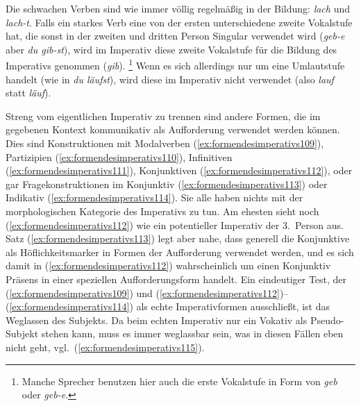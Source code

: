 Die schwachen Verben sind wie immer völlig regelmäßig in der Bildung: \textit{lach} und \textit{lach-t}.
Falls ein starkes Verb eine von der ersten unterschiedene zweite Vokalstufe hat, die sonst in der zweiten und dritten Person Singular verwendet wird (\textit{geb-e} aber \textit{du gib-st}), wird im Imperativ diese zweite Vokalstufe für die Bildung des Imperativs genommen (\textit{gib}).%
\footnote{Manche Sprecher benutzen hier auch die erste Vokalstufe in Form von \textit{geb} oder \textit{geb-e}.}
Wenn es sich allerdings nur um eine Umlautstufe handelt (wie in \textit{du läufst}), wird diese im Imperativ nicht verwendet (also \textit{lauf} statt \textit{\Ast läuf}).

Streng vom eigentlichen Imperativ zu trennen sind andere Formen, die im gegebenen Kontext kommunikativ als Aufforderung verwendet werden können.
Dies sind \zB Konstruktionen mit Modalverben (\ref{ex:formendesimperativs109}), Partizipien (\ref{ex:formendesimperativs110}), Infinitiven (\ref{ex:formendesimperativs111}), Konjunktiven (\ref{ex:formendesimperativs112}), oder gar Fragekonstruktionen im Konjunktiv (\ref{ex:formendesimperativs113}) oder Indikativ (\ref{ex:formendesimperativs114}).
Sie alle haben nichts mit der morphologischen Kategorie des Imperativs zu tun.
Am ehesten sieht noch (\ref{ex:formendesimperativs112}) wie ein potentieller Imperativ der 3.~Person aus.
Satz (\ref{ex:formendesimperativs113}) legt aber nahe, dass generell die Konjunktive als Höflichkeitsmarker in Formen der Aufforderung verwendet werden, und es sich damit in (\ref{ex:formendesimperativs112}) wahrscheinlich um einen Konjunktiv Präsens in einer speziellen Aufforderungsform handelt.
Ein eindeutiger Test, der (\ref{ex:formendesimperativs109}) und (\ref{ex:formendesimperativs112})--(\ref{ex:formendesimperativs114}) als echte Imperativformen ausschließt, ist das Weglassen des Subjekts.
Da beim echten Imperativ nur ein Vokativ als Pseudo-Subjekt stehen kann, muss es immer weglassbar sein, was in diesen Fällen eben nicht geht, vgl.\ (\ref{ex:formendesimperativs115}).


